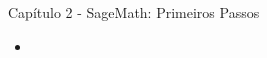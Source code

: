 \documentclass[10pt,a4paper]{report}
\begin{document}
% 
% 
% 
% 
% 
% 
% 
% 
% 

\noindent
{ \large Capítulo 2 - SageMath: Primeiros Passos}

\begin{itemize}
 \item 
\end{itemize}
\end{document}
